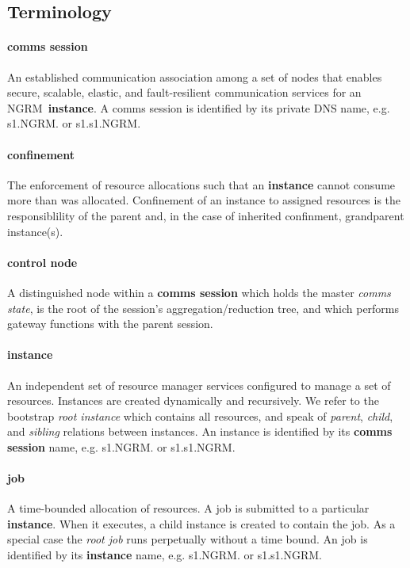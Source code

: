 \documentclass{article}
\newcommand{\ngrm}{NGRM}
\begin{document}
\subsection{Terminology}

\paragraph{comms session}
An established communication association among a set of nodes that
enables secure, scalable, elastic, and fault-resilient communication
services for an \ngrm\ {\bf instance}.
A comms session is identified by its private DNS name, e.g. s1.\ngrm.
or s1.s1.\ngrm.

\paragraph{confinement}
The enforcement of resource allocations such that an {\bf instance} cannot
consume more than was allocated.  Confinement of an instance to assigned
resources is the responsiblility of the parent and, in the case of inherited
confinment, grandparent instance(s).

\paragraph{control node}
A distinguished node within a {\bf comms session} which holds the master
{\em comms state}, is the root of the session's aggregation/reduction tree,
and which performs gateway functions with the parent session.

\paragraph{instance}
An independent set of resource manager services configured to manage
a set of resources.
Instances are created dynamically and recursively.
We refer to the bootstrap {\em root instance} which contains all resources,
and speak of {\em parent}, {\em child}, and {\em sibling} relations between
instances.
An instance is identified by its {\bf comms session} name,
e.g. s1.\ngrm.  or s1.s1.\ngrm.

\paragraph{job}
A time-bounded allocation of resources.  A job is submitted to a
particular {\bf instance}.  When it executes, a child instance is
created to contain the job.  As a special case the {\em root job} 
runs perpetually without a time bound.
An job is identified by its {\bf instance} name,
e.g. s1.\ngrm.  or s1.s1.\ngrm.
\end{document}
